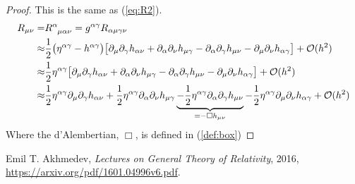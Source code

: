 \documentclass[]{article}
\begin{document}
\begin{proof}
	This is the same as (\ref{eq:R2}).
	\begin{align*}
	R_{\mu\nu} =& R\indices{^\alpha_{\mu\alpha\nu}} = g^{\alpha\gamma}R_{\alpha\mu\gamma\nu}\\
	\approx&\frac{1}{2} \big(\eta^{\alpha\gamma}- h^{\alpha\gamma}\big) \big[\partial_{\mu}\partial_{\gamma}h_{\alpha\nu} + \partial_{\alpha}\partial_{\nu}h_{\mu\gamma} - \partial_{\alpha}\partial_{\gamma}h_{\mu\nu} - \partial_{\mu}\partial_{\nu}h_{\alpha\gamma}\big]+ \mathcal{O}(h^2)\\
	\approx&\frac{1}{2} \eta^{\alpha\gamma} \big[\partial_{\mu}\partial_{\gamma}h_{\alpha\nu} + \partial_{\alpha}\partial_{\nu}h_{\mu\gamma} - \partial_{\alpha}\partial_{\gamma}h_{\mu\nu} - \partial_{\mu}\partial_{\nu}h_{\alpha\gamma}\big]+ \mathcal{O}(h^2)\\
	\approx& \frac{1}{2} \eta^{\alpha\gamma}\partial_{\mu}\partial_{\gamma}h_{\alpha\nu} + \frac{1}{2} \eta^{\alpha\gamma}\partial_{\alpha}\partial_{\nu}h_{\mu\gamma} \underbrace{- \frac{1}{2} \eta^{\alpha\gamma}\partial_{\alpha}\partial_{\gamma}h_{\mu\nu}}_{=-\Box h_{\mu\nu}} - \frac{1}{2} \eta^{\alpha\gamma}\partial_{\mu}\partial_{\nu}h_{\alpha\gamma}+ \mathcal{O}(h^2)
	\end{align*}
	Where the d'Alembertian, $\Box$, is defined in (\ref{def:box})	
\end{proof}

\begin{thebibliography}{9}
	
	Emil T. Akhmedev,
	\emph{Lectures on General Theory of Relativity},
	2016,
	\url{https://arxiv.org/pdf/1601.04996v6.pdf}.
	
	
\end{thebibliography}
\end{document}
